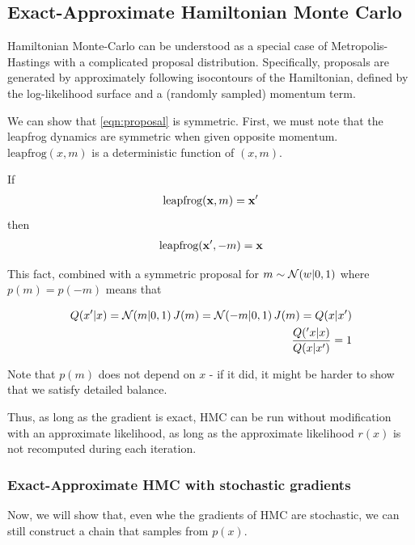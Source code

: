 \documentclass{article}
\begin{document}
\subsection{Exact-Approximate Hamiltonian Monte Carlo}

Hamiltonian Monte-Carlo can be understood as a special case of Metropolis-Hastings with a complicated proposal distribution.  Specifically, proposals are generated by approximately following isocontours of the Hamiltonian, defined by the log-likelihood surface and a (randomly sampled) momentum term.


We can show that \eqref{eqn:proposal} is symmetric.  First, we must note that the leapfrog dynamics are symmetric when given opposite momentum.  $\textrm{leapfrog}(x, m)$ is a deterministic function of $(x,m)$.

If
\begin{align}
\textrm{leapfrog}({\bf{x}}, m) = {\bf{x}}'
\end{align}
then
\begin{align}
\textrm{leapfrog}({\bf{x}}', -m) = {\bf{x}}
\end{align}

This fact, combined with a symmetric proposal for $m \sim \mathcal{N}\!\left(w|0,1\right)$ where $p(m) = p(-m)$ means that 

\begin{align}
Q( x' | x ) = \mathcal{N}\!\left(m|0,1\right)J(m) = \mathcal{N}\!\left(-m|0,1\right)J(m) = Q( x | x' ) \\
\frac{Q( 'x | x )}{Q( x | x' )} = 1
\end{align}

Note that $p(m)$ does not depend on $x$ - if it did, it might be harder to show that we satisfy detailed balance.

Thus, as long as the gradient is exact, HMC can be run without modification with an approximate likelihood, as long as the approximate likelihood $r(x)$ is not recomputed during each iteration.

\subsubsection{Exact-Approximate HMC with stochastic gradients}

Now, we will show that, even whe the gradients of HMC are stochastic, we can still construct a chain that samples from $p(x)$.
\end{document}
